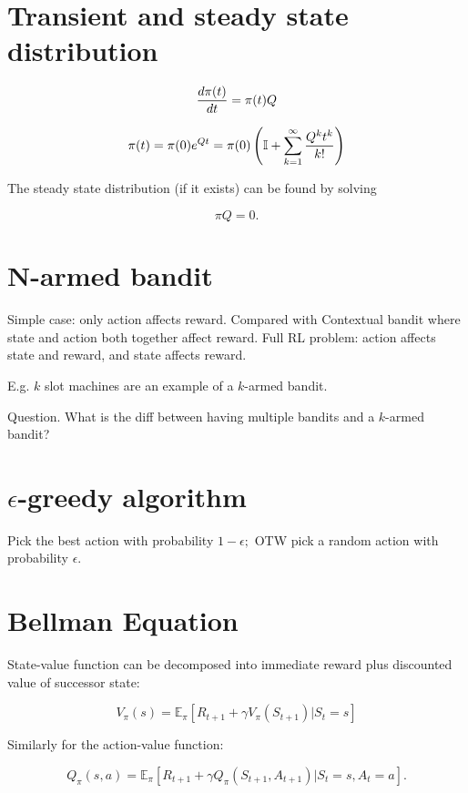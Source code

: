 \documentclass[10pt]{article}
\theoremstyle{plain}
\theoremstyle{definition}
\theoremstyle{remark}
\renewcommand\frac[2]{\genfrac{}{}{0.5pt}{}{#1}{#2}}
\newcommand{\0}{\varnothing}
\newcommand{\<}{\langle}
\renewcommand{\>}{\rangle}
\begin{document}
\section{Transient and steady state distribution}


\[
\frac { d \pi ( t ) } { d t } = \pi ( t ) Q
\]

\[
\pi ( t ) = \pi ( 0 ) e ^ { Q t } = \pi ( 0 ) \left( \mathbb { I } + \sum _ { k = 1 } ^ { \infty } \frac { Q ^ { k } t ^ { k } } { k ! } \right)
\]

The steady state distribution (if it exists) can be found by solving

\[
\pi Q = 0.
\]


\section{N-armed bandit}


Simple case: only action affects reward. Compared with Contextual bandit where
state and action both together affect reward. Full RL problem: action affects
state and reward, and state affects reward.

E.g. \( k \) slot machines are an example of a \( k \)-armed bandit.

Question. What is the diff between having multiple bandits and a \( k \)-armed
bandit?

\section{\( \epsilon \)-greedy algorithm}

Pick the best action with probability \( 1 - \epsilon; \) OTW pick a random
action with probability $ \epsilon. $

\section{Bellman Equation}


State-value function can be decomposed into immediate reward plus discounted value of successor state:


\[
V _ { \pi } ( s ) = \mathbb { E } _ { \pi } \left[ R _ { t + 1 } + \gamma V _ { \pi } \left( S _ { t + 1 } \right) | S _ { t } = s \right]
\]

Similarly for the action-value function:

\[
Q _ { \pi } ( s , a ) = \mathbb { E } _ { \pi } \left[ R _ { t + 1 } + \gamma Q _ { \pi } \left( S _ { t + 1 } , A _ { t + 1 } \right) | S _ { t } = s , A _ { t } = a \right].
\]
\end{document}
